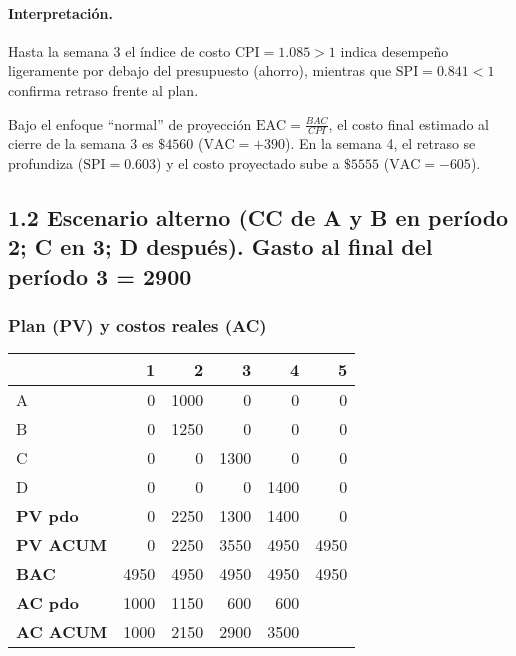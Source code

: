 \paragraph{Interpretación.}
Hasta la semana 3 el índice de costo \(\mathrm{CPI}=1.085>1\) indica desempeño ligeramente por debajo del presupuesto (ahorro), mientras que \(\mathrm{SPI}=0.841<1\) confirma retraso frente al plan.

\medskip
Bajo el enfoque ``normal'' de proyección \(\mathrm{EAC}=\frac{BAC}{CPI}\), el costo final estimado al cierre de la semana 3 es \(\$4560\) (\(\mathrm{VAC}=+390\)). En la semana 4, el retraso se profundiza (\(\mathrm{SPI}=0.603\)) y el costo proyectado sube a \(\$5555\) (\(\mathrm{VAC}=-605\)).

\subsection{1.2 Escenario alterno (CC de A y B en período 2; C en 3; D después). Gasto al final del período 3 = 2900}
\label{subsec:cancha-12}

\subsubsection*{Plan (PV) y costos reales (AC)}
\begin{table}[H]\centering\small
\begin{tabular}{lrrrrr}
\toprule
 & \textbf{1} & \textbf{2} & \textbf{3} & \textbf{4} & \textbf{5} \\
\midrule
A & 0 & 1000 & 0 & 0 & 0 \\
B & 0 & 1250 & 0 & 0 & 0 \\
C & 0 & 0 & 1300 & 0 & 0 \\
D & 0 & 0 & 0 & 1400 & 0 \\
\midrule
\textbf{PV pdo}   & 0 & 2250 & 1300 & 1400 & 0 \\
\textbf{PV ACUM}  & 0 & 2250 & 3550 & 4950 & 4950 \\
\textbf{BAC}      & 4950 & 4950 & 4950 & 4950 & 4950 \\
\midrule
\textbf{AC pdo}   & 1000 & 1150 & 600 & 600 &  \\
\textbf{AC ACUM}  & 1000 & 2150 & 2900 & 3500 &  \\
\bottomrule
\end{tabular}
\end{table}

